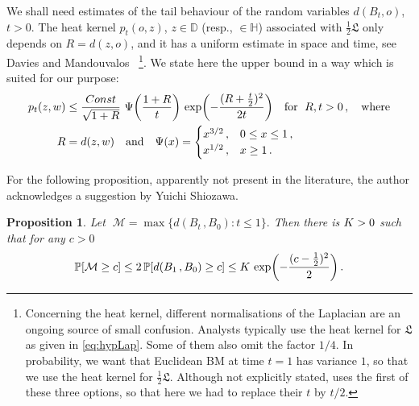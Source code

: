 \documentclass[12pt]{amsart}
\newcommand\AND{\quad\text{and}\quad}
\newcommand\DD{\mathbb D}
\newcommand\HH{\mathbb H}
\newcommand\Lap{\mathfrak{L}}
\newcommand\Prob{\mathbb P}
\newcommand\ro{d}
\numberwithin{theorem}{section}
\newtheorem{pro}[theorem]{Proposition}%
\theoremstyle{definition}
\begin{document}
We shall need estimates of the tail behaviour of the random variables $\ro(B_t, o)$, $t >0$.
The heat kernel $p_t(o,z)$, $z \in \DD$ (resp., $\in \HH$) associated with $\frac12 \Lap$ 
only depends on $R= \ro(z,o)$, and it has a
uniform estimate in space and time, see 
{\sc Davies and Mandouvalos}~\cite[Thm. 3.1]{DM}
\footnote{Concerning the heat kernel, different normalisations of the Laplacian
are an ongoing source of small confusion. Analysts typically use the heat kernel for $\Lap$ as
given in \eqref{eq:hypLap}. Some of them also omit the factor $1/4$. In probability, we want that
Euclidean BM at time $t=1$ has variance $1$, so that we use the heat kernel for $\frac12 \Lap$. 
Although  not explicitly stated, \cite{DM} uses   
the first of these three options, so that here we had to replace
their $t$ by $t/2$.}.
We state here the upper bound in a way which is suited for our purpose: 
\begin{equation}\label{eq:heat1} 
\begin{aligned}
p_t(z,w) &\le 
\frac{\textsl{Const}}{\sqrt{1+R}} \,\,  \Psi\biggl(\frac{1+R}{t}\biggr)\,   
\exp\biggl(-\frac{(R+\tfrac{t}{2})^2}{2t}\biggr) 
\quad\text{for }\; R, t > 0\,, \quad \text{where}\\ 
R &= \ro(z,w) \AND \Psi(x) = \begin{cases} x^{3/2}\,,&0 \le x \le 1\,,\\
                                              x^{1/2}\,,&x \ge 1\,. 
                                \end{cases}
\end{aligned} 
\end{equation}


For the following proposition, apparently not present in the literature, 
the author acknowledges a suggestion by Yuichi Shiozawa.

\begin{pro}\label{pro:max} Let $\; \mathcal{M} = \max \{ \ro(B_t\,, B_0) : t \le 1 \}.$ Then there
is $\textsl{K} >0$ such that
for any $c > 0$ 
$$
\Prob[\mathcal{M} \ge c] \le 2 \, \Prob[\ro(B_1\,,B_0) \ge c] \le \textsl{K}\, 
\exp\biggl(-\frac{(c-\tfrac{1}{2})^2}{2}\biggr)\,.
$$ 
\end{pro}
\end{document}
